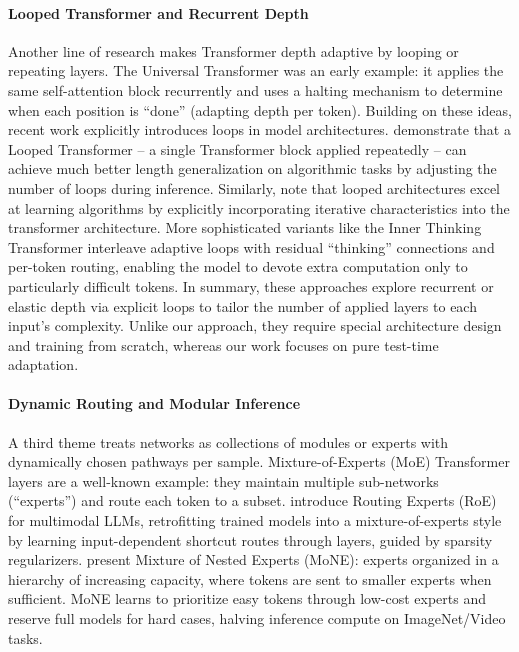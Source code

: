 \documentclass{article}
\theoremstyle{plain}
\theoremstyle{definition}
\theoremstyle{remark}
\begin{document}
\paragraph{Looped Transformer and Recurrent Depth}
Another line of research makes Transformer depth adaptive by looping or repeating layers. The Universal Transformer \cite{dehghani2018universal} was an early example: it applies the same self-attention block recurrently and uses a halting mechanism to determine when each position is ``done'' (adapting depth per token). Building on these ideas, recent work explicitly introduces loops in model architectures. \citet{fan2024looped} demonstrate that a Looped Transformer – a single Transformer block applied repeatedly – can achieve much better length generalization on algorithmic tasks by adjusting the number of loops during inference. Similarly, \citet{yang2023looped} note that looped architectures excel at learning algorithms by explicitly incorporating iterative characteristics into the transformer architecture. More sophisticated variants like the Inner Thinking Transformer \citet{chen2025inner} interleave adaptive loops with residual ``thinking'' connections and per-token routing, enabling the model to devote extra computation only to particularly difficult tokens. In summary, these approaches explore recurrent or elastic depth via explicit loops to tailor the number of applied layers to each input's complexity. Unlike our approach, they require special architecture design and training from scratch, whereas our work focuses on pure test-time adaptation.

\paragraph{Dynamic Routing and Modular Inference}
A third theme treats networks as collections of modules or experts with dynamically chosen pathways per sample. Mixture-of-Experts (MoE) Transformer layers are a well-known example: they maintain multiple sub-networks (``experts'') and route each token to a subset. \citet{wu2024routing} introduce Routing Experts (RoE) for multimodal LLMs, retrofitting trained models into a mixture-of-experts style by learning input-dependent shortcut routes through layers, guided by sparsity regularizers. \citet{jain2024mixture} present Mixture of Nested Experts (MoNE): experts organized in a hierarchy of increasing capacity, where tokens are sent to smaller experts when sufficient. MoNE learns to prioritize easy tokens through low-cost experts and reserve full models for hard cases, halving inference compute on ImageNet/Video tasks.
\end{document}
